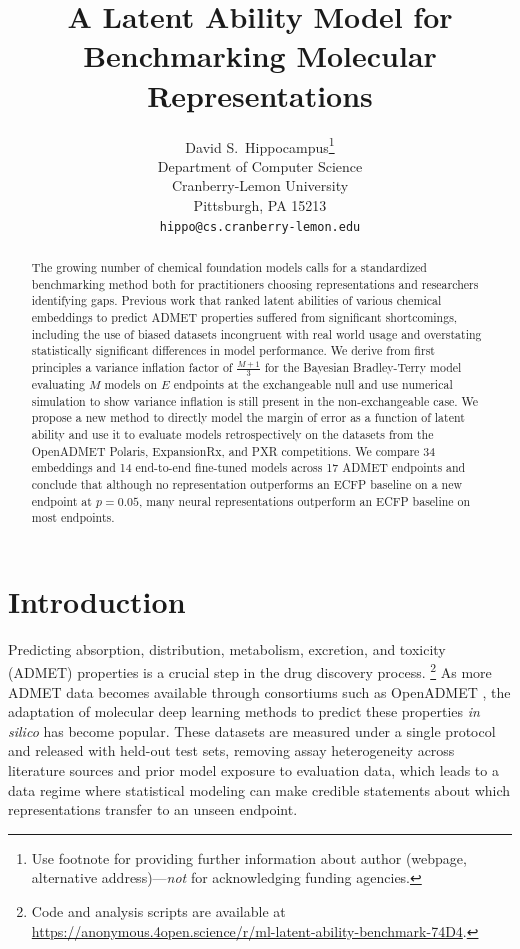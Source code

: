 \documentclass{article}
\title{A Latent Ability Model for Benchmarking Molecular Representations}
\author{%
  David S.~Hippocampus\thanks{Use footnote for providing further information
    about author (webpage, alternative address)---\emph{not} for acknowledging
    funding agencies.} \\
  Department of Computer Science\\
  Cranberry-Lemon University\\
  Pittsburgh, PA 15213 \\
  \texttt{hippo@cs.cranberry-lemon.edu} \\
}
\begin{document}
\maketitle


\begin{abstract}
  The growing number of chemical foundation models calls for a standardized benchmarking method both for practitioners choosing representations and researchers identifying gaps. Previous work that ranked latent abilities of various chemical embeddings to predict ADMET properties suffered from significant shortcomings, including the use of biased datasets incongruent with real world usage and overstating statistically significant differences in model performance. We derive from first principles a variance inflation factor of $\frac{M+1}{3}$ for the Bayesian Bradley-Terry model evaluating $M$ models on $E$ endpoints at the exchangeable null and use numerical simulation to show variance inflation is still present in the non-exchangeable case. We propose a new method to directly model the margin of error as a function of latent ability and use it to evaluate models retrospectively on the datasets from the OpenADMET Polaris, ExpansionRx, and PXR competitions. We compare 34 embeddings and 14 end-to-end fine-tuned models across 17 ADMET endpoints and conclude that although no representation outperforms an ECFP baseline on a new endpoint at $p=0.05$, many neural representations outperform an ECFP baseline on most endpoints.
\end{abstract}

\section{Introduction}
Predicting absorption, distribution, metabolism, excretion, and toxicity (ADMET) properties is a crucial step in the drug discovery process. \footnote{Code and analysis scripts are available at
\url{https://anonymous.4open.science/r/ml-latent-ability-benchmark-74D4}.} As more ADMET data becomes available through consortiums such as OpenADMET \citep{fraser2026}, the adaptation of molecular deep learning methods to predict these properties \textit{in silico} has become popular. These datasets are measured under a single protocol and released with held-out test sets, removing assay heterogeneity across literature sources \citep{landrum2024} and prior model exposure to evaluation data, which leads to a data regime where statistical modeling can make credible statements about which representations transfer to an unseen endpoint.
\end{document}

